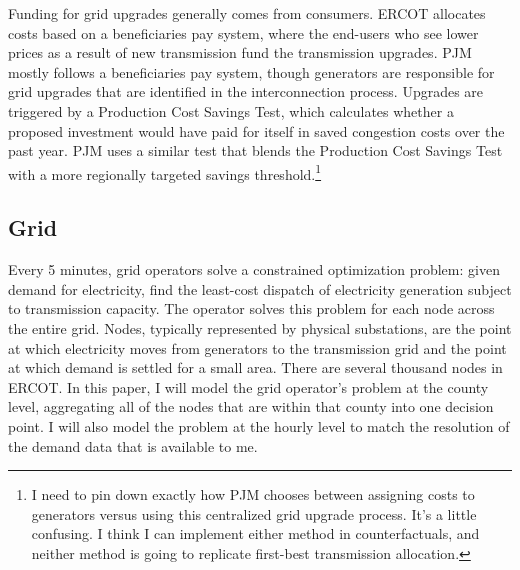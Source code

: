 \documentclass[12pt]{article}
\begin{document}
Funding for grid upgrades generally comes from consumers. ERCOT allocates costs based on a beneficiaries pay system, where the end-users who see lower prices as a result of new transmission fund the transmission upgrades. PJM mostly follows a beneficiaries pay system, though generators are responsible for grid upgrades that are identified in the interconnection process. Upgrades are triggered by a Production Cost Savings Test, which calculates whether a proposed investment would have paid for itself in saved congestion costs over the past year. PJM uses a similar test that blends the Production Cost Savings Test with a more regionally targeted savings threshold.\footnote{I need to pin down exactly how PJM chooses between assigning costs to generators versus using this centralized grid upgrade process. It's a little confusing. I think I can implement either method in counterfactuals, and neither method is going to replicate first-best transmission allocation.}


\subsection{Grid}
\label{sec:grid}

Every 5 minutes, grid operators solve a constrained optimization problem: given demand for electricity, find the least-cost dispatch of electricity generation subject to transmission capacity. The operator solves this problem for each node across the entire grid. Nodes, typically represented by physical substations, are the point at which electricity moves from generators to the transmission grid and the point at which demand is settled for a small area. There are several thousand nodes in ERCOT. In this paper, I will model the grid operator's problem at the county level, aggregating all of the nodes that are within that county into one decision point. I will also model the problem at the hourly level to match the resolution of the demand data that is available to me. 
\end{document}
